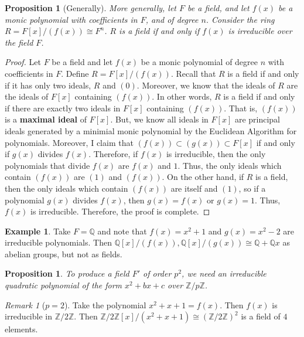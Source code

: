 \documentclass[12pt]{article}
\newtheorem{prop}[thm]{Proposition}
\theoremstyle{definition}
\newtheorem{eg}[thm]{Example}
\theoremstyle{remark}
\newtheorem{rmk}[thm]{Remark}
\numberwithin{equation}{section}
\newcommand\Z{\mathbb Z}    %
\newcommand\Q{\mathbb Q}    %
\newcommand\B[1]{\textbf{ #1}}
\begin{document}
\begin{prop}[Generally]
        More generally, let $F$ be a field, and let $f(x)$ be a monic polynomial with coefficients in $F$, and of degree $n$. Consider the ring $R = F[x]/(f(x))\cong F^n$. $R$ is a field if and only if $f(x)$ is irreducible over the field $F$.
\end{prop}
\begin{proof}
        Let $F$ be a field and let $f(x)$ be a monic polynomial of degree $n$ with coefficients in $F$. Define $R = F[x]/(f(x))$. Recall that $R$ is a field if and only if it has only two ideals, $R$ and $(0)$. Moreover, we know that the ideals of $R$ are the ideals of $F[x]$ containing $(f(x))$. In other words, $R$ is a field if and only if there are exactly two ideals in $F[x]$ containing $(f(x))$. That is, $(f(x))$ is a \B{maximal ideal} of $F[x]$. But, we know all ideals in $F[x]$ are principal ideals generated by a minimial monic polynomial by the Euclidean Algorithm for polynomials. Moreover, I claim that $(f(x)) \subset (g(x)) \subset F[x]$ if and only if $g(x)$ divides $f(x)$. Therefore, if $f(x)$ is irreducible, then the only polynomials that divide $f(x)$ are $f(x)$ and $1$. Thus, the only ideals which contain $(f(x))$ are $(1)$ and $(f(x))$. On the other hand, if $R$ is a field, then the only ideals which contain $(f(x))$ are itself and $(1)$, so if a polynomial $g(x)$ divides $f(x)$, then $g(x) = f(x)$ or $g(x) = 1$. Thus, $f(x)$ is irreducible. Therefore, the proof is complete.
\end{proof}



\vspace{15pt}

\begin{eg}
        Take $F =\Q$ and note that $f(x) = x^2+1$ and $g(x) = x^2-2$ are irreducible polynomials. Then $\Q[x]/(f(x)),\Q[x]/(g(x)) \cong \Q + \Q x$ as abelian groups, but not as fields.
\end{eg}

\vspace{15pt}

\begin{prop}
        To produce a field $F'$ of order $p^2$, we need an irreducible quadratic polynomial of the form $x^2 +bx +c$ over $\Z/p\Z$.
\end{prop}

\vspace{15pt}

\begin{rmk}[$p=2$]
        Take the polynomial $x^2 + x +1 = f(x)$. Then $f(x)$ is irreducible in $\Z/2\Z$. Then $\Z/2\Z[x]/(x^2+x+1) \cong (\Z/2\Z)^2$ is a field of $4$ elements.
\end{rmk}
\end{document}
